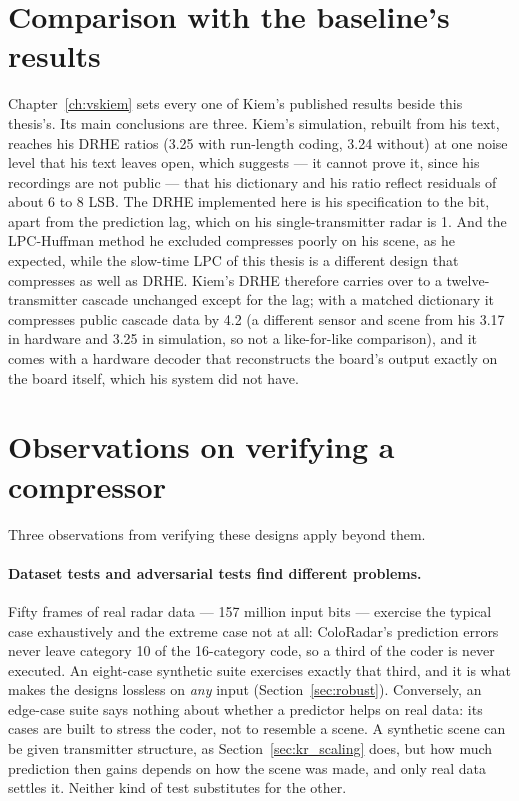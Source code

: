 \section{Comparison with the baseline's results}
\label{sec:vskiem}

Chapter~\ref{ch:vskiem} sets every one of Kiem's published results beside this
thesis's. Its main conclusions are three. Kiem's simulation, rebuilt from his
text, reaches his DRHE ratios (\num{3.25} with run-length coding, \num{3.24}
without) at one noise level that his text leaves open, which suggests --- it
cannot prove it, since his recordings are not public --- that his dictionary
and his ratio reflect residuals of about 6 to 8 LSB. The DRHE implemented
here is his specification to the bit, apart from the prediction lag, which on
his single-transmitter radar is 1. And the LPC-Huffman method he excluded
compresses poorly on his scene, as he expected, while the slow-time LPC of this
thesis is a different design that compresses as well as DRHE. Kiem's DRHE
therefore carries over to a twelve-transmitter cascade unchanged except for the
lag; with a matched dictionary it compresses public cascade data by \num{4.2}
(a different sensor and scene from his \num{3.17} in hardware and \num{3.25}
in simulation, so not a like-for-like comparison), and it comes with a hardware decoder
that reconstructs the board's output exactly on the board itself, which his
system did not have.

\section{Observations on verifying a compressor}
\label{sec:lessons}

Three observations from verifying these designs apply beyond them.

\paragraph{Dataset tests and adversarial tests find different problems.}
Fifty frames of real radar data --- \num{157} million input bits --- exercise the
typical case exhaustively and the extreme case not at all: ColoRadar's
prediction errors never leave category 10 of the 16-category code, so a third of
the coder is never executed. An eight-case synthetic suite exercises exactly
that third, and it is what makes the designs lossless on \emph{any} input
(Section~\ref{sec:robust}). Conversely, an edge-case suite says nothing about whether
a predictor helps on real data: its cases are built to stress the coder, not to
resemble a scene. A synthetic scene can be given transmitter structure, as
Section~\ref{sec:kr_scaling} does, but how much prediction then gains depends on
how the scene was made, and only real data settles it. Neither kind of test
substitutes for the other.

